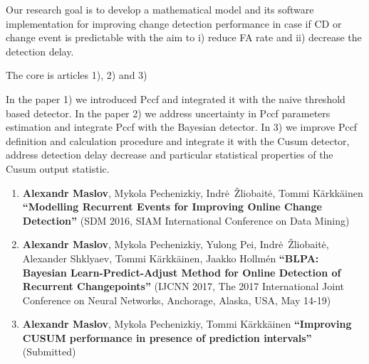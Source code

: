Our research goal is to develop a mathematical model and its software implementation for improving change detection performance in case if CD or change event is predictable with the aim to i) reduce FA rate and ii) decrease the detection delay. 


The core is articles 1), 2) and 3)

In the paper 1) we introduced Pccf and integrated it with the naive threshold based detector.
In the paper 2) we address uncertainty in Pccf parameters estimation and integrate Pccf with the Bayesian detector.
In 3) we improve Pccf definition and calculation procedure and integrate it with the Cusum detector, address detection delay decrease and particular statistical properties of the Cusum output statistic.

\begin{enumerate}[leftmargin=0.2cm]

  \item \textbf{Alexandr Maslov}, Mykola Pechenizkiy, Indr\.e~\v{Z}liobait\.e, Tommi K\"{a}rkk\"{a}inen \textbf{``Modelling Recurrent Events for Improving Online Change Detection''} (SDM 2016, SIAM International Conference on Data Mining)

  \item \textbf{Alexandr Maslov}, Mykola Pechenizkiy, Yulong Pei, Indr\.e~\v{Z}liobait\.e, Alexander Shklyaev, Tommi K\"{a}rkk\"{a}inen, Jaakko Hollm{\'e}n \textbf{``BLPA: Bayesian Learn-Predict-Adjust Method for Online  Detection of Recurrent Changepoints''} (IJCNN 2017, The 2017 International Joint Conference on Neural Networks, Anchorage, Alaska, USA, May 14-19)

  \item \textbf{Alexandr Maslov}, Mykola Pechenizkiy, Tommi K\"{a}rkk\"{a}inen \textbf{``Improving CUSUM performance in presence of prediction intervals''} (Submitted)

\end{enumerate}


